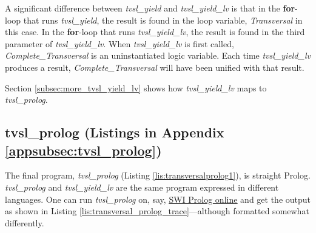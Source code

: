 A significant difference between \textit{tvsl\_yield} and \textit{tvsl\_yield\_lv} is that in the \textbf{for}-loop that runs \textit{tvsl\_yield}, the result is found in the loop variable, \textit{Transversal} in this case. In the \textbf{for}-loop that runs \textit{tvsl\_yield\_lv}, the result is found in the third parameter of \textit{tvsl\_yield\_lv}. When \textit{tvsl\_yield\_lv} is first called, \textit{Complete\_Transversal} is an uninstantiated logic variable. Each time \textit{tvsl\_yield\_lv} produces a result, \textit{Complete\_Transversal} will have been unified with that result.

Section \ref{subsec:more_tvsl_yield_lv} shows how \textit{tvsl\_yield\_lv} maps to \textit{tvsl\_prolog}.

\subsection{tvsl\_prolog (Listings in Appendix \ref{appsubsec:tvsl_prolog})} \label{subsec:tvsl_prolog}

The final program, \textit{tvsl\_prolog} (Listing \ref{lis:transversalprolog1}), is straight Prolog. \textit{tvsl\_prolog} and \textit{tvsl\_yield\_lv} are the same program expressed in different languages. One can run \textit{tvsl\_prolog} on, say, \href{https://swish.swi-prolog.org/}{\underline{SWI Prolog online}} and get the output as shown in Listing \ref{lis:transversal_prolog_trace}---although formatted somewhat differently.





